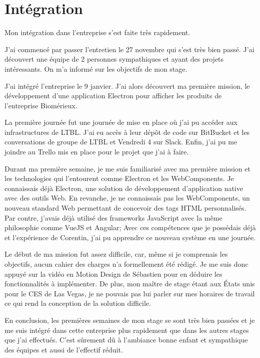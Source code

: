 \documentclass{article}
\begin{document}
\section{Intégration}

Mon intégration dans l'entreprise s'est faite très rapidement.

J'ai commencé par passer l'entretien le 27 novembre qui s'est très bien passé.
J'ai découvert une équipe de 2 personnes sympathiques et ayant des projets intéressants.
On m'a informé sur les objectifs de mon stage.

J'ai intégré l'entreprise le 9 janvier.
J'ai alors découvert ma première mission, le développement d'une application Electron pour afficher les produits de l'entreprise Biomérieux.

La première journée fut une journée de mise en place où j'ai pu accéder aux infrastructures de LTBL.
J'ai eu accès à leur dépôt de code sur BitBucket et les conversations de groupe de LTBL et Vendredi 4 sur Slack.
Enfin, j'ai pu me joindre au Trello mis en place pour le projet que j'ai à faire.

Durant ma première semaine, je me suis familiarisé avec ma première mission et les technologies qui l'entourent comme Electron et les WebComponents.
Je connaissais déjà Electron, une solution de développement d'application native avec des outils Web.
En revanche, je ne connaissais pas les WebComponents, un nouveau standard Web permettant de concevoir des tags HTML personnalisés.
Par contre, j'avais déjà utilisé des frameworks JavaScript avec la même philosophie comme VueJS et Angular;
Avec ces compétences que je possédais déjà et l'expérience de Corentin, j'ai pu apprendre ce nouveau système en une journée.

Le début de ma mission fut assez difficile, car, même si je comprenais les objectifs, aucun cahier des charges n'a formellement été rédigé.
Je me suis donc appuyé sur la vidéo en Motion Design de Sébastien pour en déduire les fonctionnalités à implémenter.
De plus, mon maître de stage étant aux États unis pour le CES de Las Vegas, je ne pouvais pas lui parler sur mes horaires de travail ce qui rend la conception de la solution difficile.

En conclusion, les premières semaines de mon stage se sont très bien passées et je me suis intégré dans cette entreprise plus rapidement que dans les autres stages que j'ai effectués.
C'est sûrement dû à l'ambiance bonne enfant et sympathique des équipes et aussi de l'effectif réduit.
\end{document}
